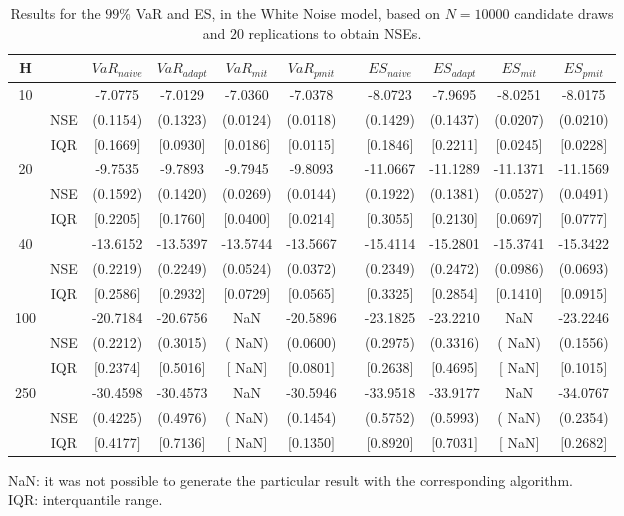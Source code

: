 \begin{table}[h] 
\centering 
\caption{Results for the $99\%$ VaR and ES, in the White Noise model, based on $N=10000$ candidate draws and $20$ replications to obtain NSEs.} 
\label{tab:res_algos_WN} 
\begin{tabular}{ccccccccccc}  
 H & & $VaR_{naive}$ & $VaR_{adapt}$ & $VaR_{mit}$  & $VaR_{pmit}$ &  & $ES_{naive}$ & $ES_{adapt}$ & $ES_{mit}$ & $ES_{pmit}$ \\ \hline 
10 & & -7.0775 & -7.0129 & -7.0360 & -7.0378 & & -8.0723 & -7.9695 & -8.0251 & -8.0175  \\ 
  & NSE & (0.1154) & (0.1323) & (0.0124) & (0.0118) & & (0.1429) & (0.1437) & (0.0207) & (0.0210)   \\ 
 & IQR & $[$0.1669$]$ & $[$0.0930$]$ & $[$0.0186$]$ & $[$0.0115$]$ & & $[$0.1846$]$ & $[$0.2211$]$ & $[$0.0245$]$ & $[$0.0228$]$  \\ [1ex] 
20 & & -9.7535 & -9.7893 & -9.7945 & -9.8093 & & -11.0667 & -11.1289 & -11.1371 & -11.1569  \\ 
  & NSE & (0.1592) & (0.1420) & (0.0269) & (0.0144) & & (0.1922) & (0.1381) & (0.0527) & (0.0491)   \\ 
 & IQR & $[$0.2205$]$ & $[$0.1760$]$ & $[$0.0400$]$ & $[$0.0214$]$ & & $[$0.3055$]$ & $[$0.2130$]$ & $[$0.0697$]$ & $[$0.0777$]$  \\ [1ex] 
40 & & -13.6152 & -13.5397 & -13.5744 & -13.5667 & & -15.4114 & -15.2801 & -15.3741 & -15.3422  \\ 
  & NSE & (0.2219) & (0.2249) & (0.0524) & (0.0372) & & (0.2349) & (0.2472) & (0.0986) & (0.0693)   \\ 
 & IQR & $[$0.2586$]$ & $[$0.2932$]$ & $[$0.0729$]$ & $[$0.0565$]$ & & $[$0.3325$]$ & $[$0.2854$]$ & $[$0.1410$]$ & $[$0.0915$]$  \\ [1ex] 
100 & & -20.7184 & -20.6756 &    NaN & -20.5896 & & -23.1825 & -23.2210 &    NaN & -23.2246  \\ 
  & NSE & (0.2212) & (0.3015) & (   NaN) & (0.0600) & & (0.2975) & (0.3316) & (   NaN) & (0.1556)   \\ 
 & IQR & $[$0.2374$]$ & $[$0.5016$]$ & $[$   NaN$]$ & $[$0.0801$]$ & & $[$0.2638$]$ & $[$0.4695$]$ & $[$   NaN$]$ & $[$0.1015$]$  \\ [1ex] 
250 & & -30.4598 & -30.4573 &    NaN & -30.5946 & & -33.9518 & -33.9177 &    NaN & -34.0767  \\ 
  & NSE & (0.4225) & (0.4976) & (   NaN) & (0.1454) & & (0.5752) & (0.5993) & (   NaN) & (0.2354)   \\ 
 & IQR & $[$0.4177$]$ & $[$0.7136$]$ & $[$   NaN$]$ & $[$0.1350$]$ & & $[$0.8920$]$ & $[$0.7031$]$ & $[$   NaN$]$ & $[$0.2682$]$  \\ [1ex] 
\hline 
\end{tabular} 
\raggedright 

\vspace{5pt}\footnotesize{NaN: it was not possible to generate the particular result with the corresponding algorithm.} \\ 
\vspace{5pt}\footnotesize{IQR: interquantile range.} 
\end{table} 
